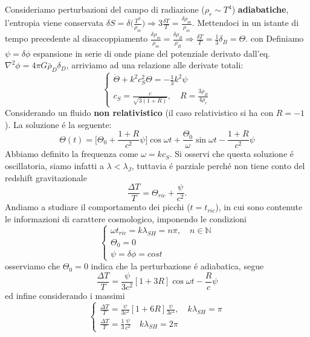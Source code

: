 \documentclass[12pt, a4paper]{article}
\begin{document}
Consideriamo perturbazioni del campo di radiazione ($\rho_r \sim T^4$)  \textbf{adiabatiche}, l'entropia viene conservata $\delta S=\delta \biggl(\frac{T^3}{\rho_m}\biggr) \Rightarrow 3\frac{\delta T}{T}=\frac{\delta \rho_m}{\rho_m}$. Mettendoci in un istante di tempo precedente al disaccoppiamento $\frac{\delta \rho_m}{\rho_m}=\frac{\delta \rho_B}{\rho_B} \Rightarrow \frac{\delta T}{T}=\frac{1}{3}\delta_B=\Theta$. con Definiamo $\psi=\delta \phi $ espansione in serie di onde piane del potenziale derivato dall'eq. $\nabla^2 \phi=4 \pi G \bar{\rho}_D \delta_D$, arriviamo ad una relazione alle derivate totali:
\begin{equation}
\begin{cases}
\ddot{\Theta}+k^2 c_S^2 \Theta=-\frac{1}{3}k^2 \psi
\\
c_S=\frac{c}{\sqrt{3(1+R)}}, \quad R=\frac{3\rho_B}{4\rho_r}
\end{cases}
\end{equation}
Considerando un fluido \textbf{non relativistico} (il caso relativistico si ha con $R=-1$). La soluzione \'{e} la seguente:
\begin{equation}
\Theta(t)=\biggl[ \Theta_0+\frac{1+R}{c^2}\psi \biggr]\cos{\omega t}+\frac{\Theta_0}{\omega}\sin{\omega t}-\frac{1+R}{c^2} \psi
\end{equation}
Abbiamo definito la frequenza come $\omega=kc_S$. Si osservi che questa soluzione \'{e} oscillatoria, siamo infatti a $\lambda <\lambda_J$, tuttavia \'{e} parziale perch\'{e} non tiene conto del redshift gravitazionale
\begin{equation}
\frac{\Delta T}{T}=\Theta_{ric}+\frac{\psi}{c^2}.
\end{equation}
Andiamo a studiare il comportamento dei picchi ($t=t_{ric} $), in cui sono contenute le informazioni di carattere cosmologico, imponendo le condizioni
\begin{equation}
\begin{cases}
\omega t_{ric}=k\lambda_{SH}=n\pi, \quad n\in \mathbb{N}
\\
\Theta_0=0
\\
\psi=\delta \phi=cost
\end{cases}
\end{equation}
osserviamo che $\Theta_0=0$ indica che la perturbazione \'{e} adiabatica, segue
\begin{equation}
\frac{\Delta T}{T}= \frac{\psi}{3c^2}[1+3R] \cos{\omega t}-\frac{R}{c}\psi
\end{equation}
ed infine considerando i massimi
\begin{equation}
\begin{cases}
\frac{\Delta T}{T}= \frac{\psi}{3c^2}[1+6R] \frac{\psi}{3c^2}, \quad k\lambda_{SH}=\pi
\\
\frac{\Delta T}{T}=\frac{1}{3} \frac{\psi}{c^2}\quad k\lambda_{SH}=2\pi
\end{cases}
\end{equation}
\end{document}

